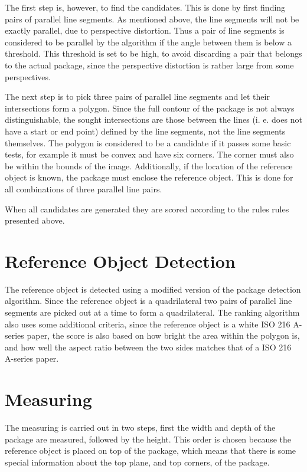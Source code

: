 The first step is, however, to find the candidates.
This is done by first finding pairs of parallel line segments. 
As mentioned above, the line segments will not be exactly parallel, due to perspective distortion. %
Thus a pair of line segments is considered to be parallel by the algorithm if the angle between them is below a threshold. 
This threshold is set to be high, to avoid discarding a pair that belongs to the actual package, since the perspective distortion is rather large from some perspectives. %

The next step is to pick three pairs of parallel line segments and let their intersections form a polygon. 
Since the full contour of the package is not always distinguishable, the sought intersections are those between the lines (i. e. does not have a start or end point) defined by the line segments, not the line segments themselves. %
The polygon is considered to be a candidate if it passes some basic tests, for example it must be convex and have six corners. 
The corner must also be within the bounds of the image.
Additionally, if the location of the reference object is known, the package must enclose the reference object.
This is done for all combinations of three parallel line pairs.

When all candidates are generated they are scored according to the rules rules presented above.

\section{Reference Object Detection}

The reference object is detected using a modified version of the package detection algorithm.
Since the reference object is a quadrilateral two pairs of parallel line segments are picked out at a time to form a quadrilateral.
The ranking algorithm also uses some additional criteria, since the reference object is a white ISO 216 A-series  paper, the score is also based on how bright the area within the polygon is, and how well the aspect ratio between the two sides matches that of a ISO 216 A-series paper.

\section{Measuring}
The measuring is carried out in two steps, first the width and depth of the package are measured, followed by the height. 
This order is chosen because the reference object is placed on top of the package, which means that there is some special information about the top plane, and top corners, of the package.

